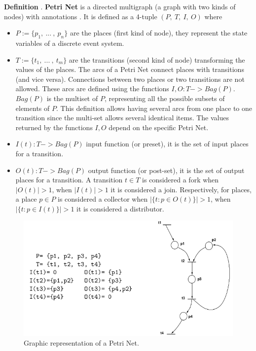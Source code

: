 \documentclass[12pt,english]{article} %
\newcounter{definitioncounter}
\newcommand*{\definition}[2]{\textbf{Definition \thedefinitioncounter\refstepcounter{definitioncounter}}.
\textbf{#1}#2}
\begin{document}
\definition{Petri Net}{ is a directed multigraph (a graph with two kinds of nodes) with annotations \cite{lecture-notes-concurrent-systems-validation}. It is defined as a 4-tuple $(P,\ T,\ I,\ O)$ where 
\begin{itemize}
    \item $P := \{p_1,\ ... \ ,\ p_n\}$ are the places (first kind of node), they represent the state variables of a discrete event system.
    \item $T := \{t_1,\ ...\ ,\ t_m\}$ are the transitions (second kind of node) transforming the values of the places.
    \newline
    \newline
    The arcs of a Petri Net connect places with transitions (and vice versa).
    Connections between two places or two transitions are not allowed.
    These arcs are defined using the functions $I, O: T -> Bag(P)$. $Bag(P)$ is the multiset of $P$, representing all the possible subsets of elements of $P$.
    This definition allows having several arcs from one place to one transition since the multi-set allows several identical items.
     The values returned by the functions $I, O$ depend on the specific Petri Net.
    \item $I(t): T -> Bag(P)$ input function (or preset), it is the set of input places for a transition.
    \item $O(t): T -> Bag(P)$ output function (or post-set), it is the set of output places for a transition.
    \newline
    \newline
    A transition $t\in T$ is considered a fork when $|O(t)| > 1$, when $|I(t)| > 1$ it is considered a join.
    Respectively, for places, a place $p\in P$ is considered a collector when
    $|\{ t : p\in O(t) \}| > 1$, when $|\{ t : p\in I(t) \}| > 1$ it is considered a distributor.
\end{itemize}}

\begin{figure}[H]
    \centering
    \includegraphics[scale=0.525]{img/petri-net/petri-net-example.png}
    \caption{Graphic representation of a Petri Net.}
    \label{fig:petri-net-example}
\end{figure}
\end{document}

